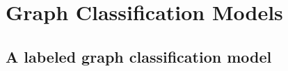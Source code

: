 \documentclass[10pt,journal,cspaper,compsoc]{IEEEtran}
\begin{document}






\section{Graph Classification Models} %
\label{sec:shuffler_graph_class_models}

\subsection{A labeled graph classification model} %
\label{sub:a_labeled_graph_classification_model}

\end{document}
